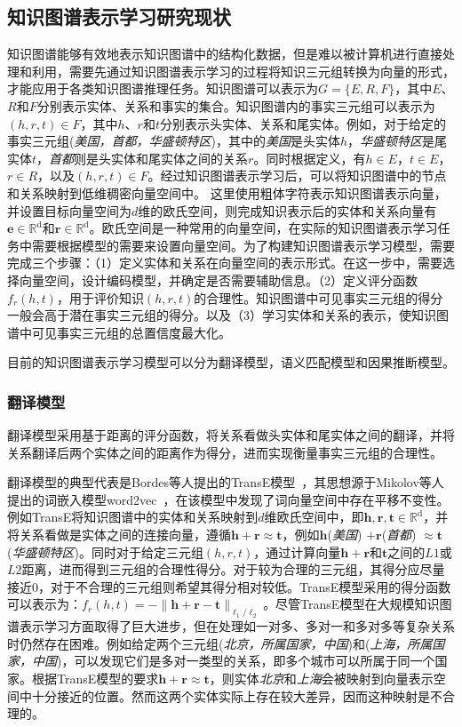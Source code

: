 \documentclass[algorithmlist, AutoFakeBold, AutoFakeSlant, figurelist, tablelist, nomlist, engineering]{seuthesix}
\begin{document}
\subsection{知识图谱表示学习研究现状}
知识图谱能够有效地表示知识图谱中的结构化数据，但是难以被计算机进行直接处理和利用，需要先通过知识图谱表示学习的过程将知识三元组转换为向量的形式，才能应用于各类知识图谱推理任务。知识图谱可以表示为$G=\{E, R, F\}$，其中$E$、$R$和$F$分别表示实体、关系和事实的集合。知识图谱内的事实三元组可以表示为$(h, r, t) \in F$，其中$h$、$r$和$t$分别表示头实体、关系和尾实体。例如，对于给定的事实三元组(\textit{美国，首都，华盛顿特区})，其中的\textit{美国}是头实体$h$，\textit{华盛顿特区}是尾实体$t$，\textit{首都}则是头实体和尾实体之间的关系$r$。同时根据定义，有$h \in E$，$t \in E$，$r \in R$，以及$(h, r, t) \in F$。经过知识图谱表示学习后，可以将知识图谱中的节点和关系映射到低维稠密向量空间中。
这里使用粗体字符表示知识图谱表示向量，并设置目标向量空间为$d$维的欧氏空间，则完成知识表示后的实体和关系向量有$\bm{e} \in \mathbb{R}^{\mathrm{d}}$和$\bm{r} \in \mathbb{R}^{\mathrm{d}}$。欧氏空间是一种常用的向量空间，在实际的知识图谱表示学习任务中需要根据模型的需要来设置向量空间。为了构建知识图谱表示学习模型，需要完成三个步骤：（1）定义实体和关系在向量空间的表示形式。在这一步中，需要选择向量空间，设计编码模型，并确定是否需要辅助信息。（2）定义评分函数$f_r(h, t)$，用于评价知识$(h, r, t)$的合理性。知识图谱中可见事实三元组的得分一般会高于潜在事实三元组的得分。以及（3）学习实体和关系的表示，使知识图谱中可见事实三元组的总置信度最大化。

目前的知识图谱表示学习模型可以分为翻译模型，语义匹配模型和因果推断模型。

\subsubsection{翻译模型}
翻译模型采用基于距离的评分函数，将关系看做头实体和尾实体之间的翻译，并将关系翻译后两个实体之间的距离作为得分，进而实现衡量事实三元组的合理性。

翻译模型的典型代表是Bordes等人提出的TransE模型~\cite{bordes2013translating}，其思想源于Mikolov等人提出的词嵌入模型word2vec~\cite{toms2013}，在该模型中发现了词向量空间中存在平移不变性。例如TransE将知识图谱中的实体和关系映射到$d$维欧氏空间中，即$\bm{h}, \bm{r}, \bm{t} \in \mathbb{R}^{\mathrm{d}}$，并将关系看做是实体之间的连接向量，遵循$\bm{h} + \bm{r} \approx \bm{t}$，例如$\bm{h}$(\textit{美国}) $+ \bm{r}$(\textit{首都}) $\approx \bm{t}$(\textit{华盛顿特区})。同时对于给定三元组$(h, r, t)$，通过计算向量$\bm{h} + \bm{r}$和$\bm{t}$之间的$L1$或$L2$距离，进而得到三元组的合理性得分。对于较为合理的三元组，其得分应尽量接近0，对于不合理的三元组则希望其得分相对较低。TransE模型采用的得分函数可以表示为：$f_r(h, t) = - \|\bm{h} + \bm{r} - \bm{t}\|_{\ell_1 / \ell_2}$。尽管TransE模型在大规模知识图谱表示学习方面取得了巨大进步，但在处理如一对多、多对一和多对多等复杂关系时仍然存在困难。例如给定两个三元组(\textit{北京，所属国家，中国})和(\textit{上海，所属国家，中国})，可以发现它们是多对一类型的关系，即多个城市可以所属于同一个国家。根据TransE模型的要求$\bm{h} + \bm{r} \approx \bm{t}$，则实体\textit{北京}和\textit{上海}会被映射到向量表示空间中十分接近的位置。然而这两个实体实际上存在较大差异，因而这种映射是不合理的。
\end{document}
